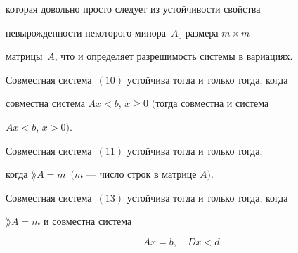 которая довольно просто следует из устойчивости свойства


невырожденности некоторого минора~$A_0$ размера $m\times m$


матрицы~$A$, что и определяет разрешимость системы в вариациях.





\begin{thm}


Совместная система~$(10)$ устойчива тогда и только тогда, когда


совместна система $Ax<b$, $x\geq 0$ $($тогда совместна и система


$Ax<b$, $x>0)$.


\end{thm}





\begin{thm}


Совместная система~$(11)$ устойчива тогда и только тогда,


когда $\rang A=m$\ $(m$ --- число строк в матрице $A)$.


\end{thm}





\begin{thm}


Совместная система~$(13)$ устойчива тогда и только тогда, когда


$\rang A=m$ и совместна система


\begin{equation}


Ax=b,\quad Dx<d.


\end{equation}


\end{thm}






